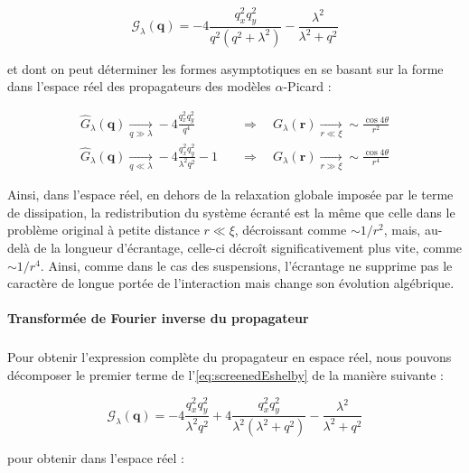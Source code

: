 \begin{equation}
    \mathcal{G}_\lambda(\mathbf{q}) = -4\frac{q_x^2q_y^2}{q^2(q^2+\lambda^2)}-\frac{\lambda^2}{\lambda^2+q^2}
    \label{eq:screenedEshelby}
\end{equation}

\noindent et dont on peut déterminer les formes asymptotiques en se basant sur la forme dans l'espace réel des propagateurs des modèles $\alpha$-Picard :

\begin{equation}
\begin{aligned}
    \hat{G}_\lambda(\mathbf{q})\xrightarrow[q\gg \lambda]{}-4\frac{q_x^2q_y^2}{q^4} \quad &\Rightarrow \quad G_\lambda(\mathbf{r})\xrightarrow[r\ll \xi]{}\sim\frac{\cos 4\theta}{r^2}\\
    \hat{G}_\lambda(\mathbf{q})\xrightarrow[q \ll \lambda]{}-4\frac{q_x^2q_y^2}{\lambda^2 q^2}-1 \quad &\Rightarrow \quad G_\lambda(\mathbf{r})\xrightarrow[r \gg \xi]{}\sim\frac{\cos 4\theta}{r^4}
\end{aligned}
\end{equation}

\noindent Ainsi, dans l'espace réel, en dehors de la relaxation globale imposée par le terme de dissipation, la redistribution du système écranté est la même que celle dans le problème original à petite distance $r\ll \xi$, décroissant comme $\sim 1/r^2$, mais, au-delà de la longueur d'écrantage, celle-ci décroît significativement plus vite, comme $\sim 1/r^4$. Ainsi, comme dans le cas des suspensions, l'écrantage ne supprime pas le caractère de longue portée de l'interaction mais change son évolution algébrique.

\paragraph{Transformée de Fourier inverse du propagateur}

\subparagraph{}Pour obtenir l'expression complète du propagateur en espace réel, nous pouvons décomposer le premier terme de l'\autoref{eq:screenedEshelby} de la manière suivante :

\begin{equation}
    \mathcal{G}_\lambda(\mathbf{q}) = -4\frac{q_x^2q_y^2}{\lambda^2 q^2} + 4\frac{q_x^2q_y^2}{\lambda^2 (\lambda^2 + q^2)}-\frac{\lambda^2}{\lambda^2+q^2}
\end{equation}

\noindent pour obtenir dans l'espace réel :

